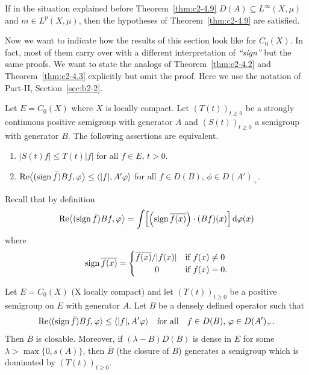 \begin{example}\label{ex:c2-4.11}
If in the situation explained before Theorem~\ref{thm:c2-4.9}  
$D(A) \subseteq L^{\infty}(X,\mu)$ and $m \in L^{p}(X,\mu)$, then the hypotheses of Theorem~\ref{thm:c2-4.9}   are satisfied.
\end{example}
Now we want to indicate how the results of this section look like for $C_{0}(X)$.
In fact, most of them carry over with a different interpretation of \emph{``sign''} but the same proofs.
We want to state the analogs of Theorem~\ref{thm:c2-4.2}   and Theorem~\ref{thm:c2-4.3}   explicitly but omit the proof.
Here we use the notation of Part-II, Section~\ref{sec:b2-2}.
\begin{theorem}\label{thm:c2-4.12}
Let $E = C_{0}(X)$ where $X$ is locally compact.
Let $(T(t))_{t \geq 0}$ be a strongly continuous positive semigroup with
generator $A$ and $(S(t))_{t \geq 0}$ a semigroup with generator $B$.
The following assertions are equivalent.
\begin{enumerate}[\upshape (a)]
\item \label{thm:c2-4.12-1}
$|S(t)f| \leq T(t)|f|$ for all $f \in E$, $t > 0$.
\item \label{thm:c2-4.12-2}
$\Re\mleft\langle(\sign  \bar{f})Bf,\phi\mright\rangle \leq \langle|f|,A'\phi\rangle$ for all $f \in D(B)$, $\phi \in D(A')_{+}$.
\end{enumerate}
\end{theorem}
Recall that by definition
\[
\Re\mleft\langle(\sign  \bar{f})Bf,\phi\mright\rangle = \int \mleft[\mleft(\sign \overline{f(x)}\mright)\cdot(Bf)(x)\mright] \diff{\phi(x)}
\]
where 
\[\operatorname{sign}  \overline{f(x)} =
\begin{cases}
    \overline{f(x)}/|f(x)| & \text{if } f(x) \neq 0 \\
    \ \quad\quad0  & \text{if } f(x) = 0 .
\end{cases}
\]
\begin{theorem}\label{thm:c2-4.13}
Let $E = C_{0}(X)$ (X locally compact) and let $(T(t))_{t \geq 0}$
be a positive semigroup on $E$ with generator $A$.
Let $B$ be a densely defined operator such that
\begin{equation}\label{eq:c2-4.12}
\Re  \langle(\sign  \bar{f})Bf,\phi\rangle \leq \langle|f|,A'\phi\rangle \quad 
\text{for all} \quad f \in D(B),\, \phi \in D(A')_{+}.
\end{equation}
Then $B$ is closable.
Moreover, if\/ $(\lambda - B)D(B)$ is dense in $E$ for some $\lambda > \max\{0,s(A)\}$, then $\overline{B}$ (the closure of\/ $B$) generates a
semigroup which is dominated by $(T(t))_{t \geq 0}$.
\end{theorem}
